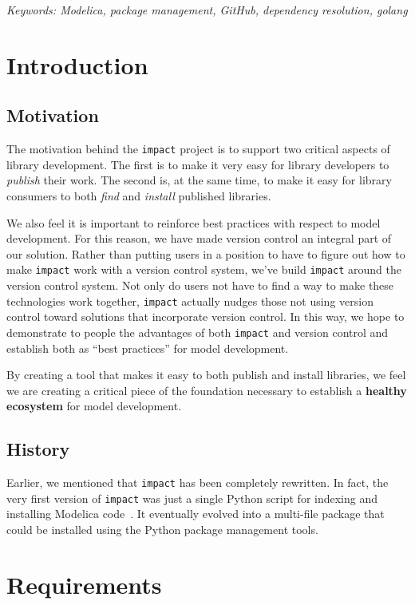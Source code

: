 \documentclass[11pt,a4paper,twocolumn]{article}
\newcommand{\code}[1]{\texttt{#1}} %
\begin{document}
\noindent\emph{Keywords: Modelica, package management, GitHub, dependency resolution, golang}

\section{Introduction}

\subsection{Motivation}

The motivation behind the \code{impact} project is to support two
critical aspects of library development.  The first is to make it very
easy for library developers to \emph{publish} their work.  The second
is, at the same time, to make it easy for library consumers to both
\emph{find} and \emph{install} published libraries.

We also feel it is important  to reinforce best practices with respect
to model development.   For this reason, we have  made version control
an integral  part of  our solution.   Rather than  putting users  in a
position to have  to figure out how to make  \code{impact} work with a
version control  system, we've build \code{impact}  around the version
control system.   Not only  do users not  have to find  a way  to make
these technologies work together,  \code{impact} actually nudges those
not using  version control  toward solutions that  incorporate version
control.  In this way, we hope to demonstrate to people the advantages
of both \code{impact} and version control and establish both as ``best
practices'' for model development.

By creating a tool that makes it easy to both publish and install
libraries, we feel we are creating a critical piece of the foundation
necessary to establish a \textbf{healthy ecosystem} for model
development.

\subsection{History}

Earlier, we mentioned that \code{impact} has been completely
rewritten.  In fact, the very first version of \code{impact} was just
a single Python script for indexing and installing Modelica
code~\parencite{impact-gist}.  It eventually evolved into a multi-file
package that could be installed using the Python package management
tools.

\section{Requirements}
\end{document}
